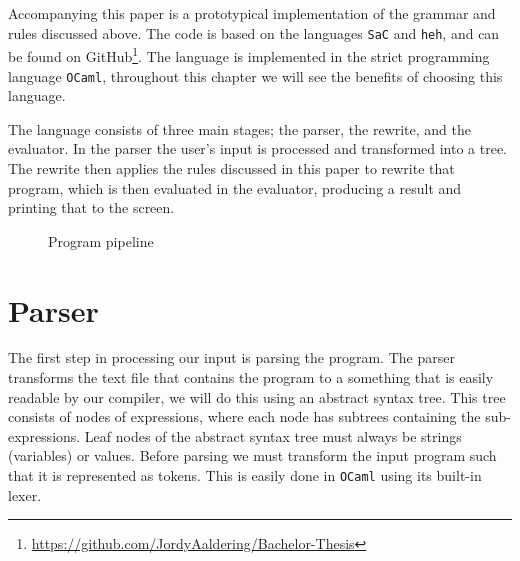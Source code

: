 \documentclass[../main.tex]{subfiles}
\begin{document}
Accompanying this paper is a prototypical implementation of the grammar and rules discussed above. The code is based on the languages \texttt{SaC}\cite{sac-backend} and \texttt{heh}\cite{auxiliary-computations}, and can be found on GitHub\footnote{\url{https://github.com/JordyAaldering/Bachelor-Thesis}}. The language is implemented in the strict programming language \texttt{OCaml}\cite{ocaml}, throughout this chapter we will see the benefits of choosing this language.

The language consists of three main stages; the parser, the rewrite, and the evaluator. In the parser the user's input is processed and transformed into a tree. The rewrite then applies the rules discussed in this paper to rewrite that program, which is then evaluated in the evaluator, producing a result and printing that to the screen.

\begin{figure}[h!]
    \centering
    \caption{Program pipeline}
    \label{fig:pipeline}
\end{figure}

\section{Parser}
The first step in processing our input is parsing the program. The parser transforms the text file that contains the program to a something that is easily readable by our compiler, we will do this using an abstract syntax tree. This tree consists of nodes of expressions, where each node has subtrees containing the sub-expressions. Leaf nodes of the abstract syntax tree must always be strings (variables) or values. 
Before parsing we must transform the input program such that it is represented as tokens. This is easily done in \texttt{OCaml} using its built-in lexer\cite{ocamllex}.
\end{document}
